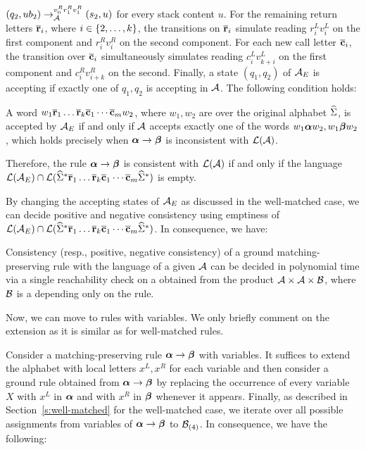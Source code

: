 $(q_2,u b_2) \rightarrow_{\mathcal{A}}^{v_0^R r_1^R v_1^R} (s_2, u)$ for every stack content $u$. 
For the remaining return letters $\overline{\mathbf{r}}_i$, where $i \in \{2, \ldots,k\}$,
the transitions on $\overline{\mathbf{r}}_i$ simulate reading  $r_i^L v_i^L$  on the first component and $r_i^R v_i^R$ on the second component.
For each new call letter $\overline{\mathbf{c}}_i$, the transition over $\overline{\mathbf{c}}_i$ simultaneously  simulates reading $c_i^L v_{k+i}^L$ on the first component and $c_i^R v_{i+k}^R$ on the second.
Finally, a state $(q_1, q_2)$ of $\mathcal{A}_E$ is accepting if exactly one of $q_1, q_2$ is accepting in $\mathcal{A}$. The following condition holds:
\begin{claim}
A  word  $w_1 \overline{\mathbf{r}}_1 \ldots \overline{\mathbf{r}}_k \overline{\mathbf{c}}_1 \cdots \overline{\mathbf{c}}_m w_2$, where $w_1, w_2$ are over the original alphabet $\widehat{\Sigma}$, is accepted by $\mathcal{A}_E$  
if and only if $\mathcal{A}$ accepts exactly one of the words $w_1 \boldsymbol{\alpha} w_2, w_1 \boldsymbol{\beta} w_2$, which holds precisely when $\boldsymbol{\alpha} \to \boldsymbol{\beta}$ is inconsistent with $\mathcal{L}(\mathcal{A})$.
\end{claim}
Therefore, the rule $\boldsymbol{\alpha} \to \boldsymbol{\beta}$ is consistent with $\mathcal{L}(\mathcal{A})$ if and only if
the language $\mathcal{L}(\mathcal{A}_E) \cap \mathcal{L}(\widehat{\Sigma}^* \overline{\mathbf{r}}_1 \ldots \overline{\mathbf{r}}_k \overline{\mathbf{c}}_1 \cdots \overline{\mathbf{c}}_m \widehat{\Sigma}^*)$ is empty.

By changing the accepting states of $\mathcal{A}_E$ as discussed in the well-matched case, we can decide positive and negative consistency 
using emptiness of $\mathcal{L}(\mathcal{A}_E) \cap \mathcal{L}(\widehat{\Sigma}^* \overline{\mathbf{r}}_1 \ldots \overline{\mathbf{r}}_k \overline{\mathbf{c}}_1 \cdots \overline{\mathbf{c}}_m \widehat{\Sigma}^*)$.
In consequence, we have:

\begin{proposition}
Consistency (resp.,  positive, negative consistency) of a ground matching-preserving rule with the language of a given \DVPA $\mathcal{A}$ can be decided in polynomial time via a single reachability check on a \DVPA obtained from the product $\mathcal{A} \times \mathcal{A} \times \mathcal{B}$, where $\mathcal{B}$ is a \DFA depending only on the rule.
\end{proposition}

Now, we can move to rules with variables. We only briefly comment on the extension as it is similar as for well-matched rules.

Consider a matching-preserving rule $\boldsymbol{\alpha} \to \boldsymbol{\beta}$ with variables.
It suffices to extend the alphabet with local letters $x^L, x^R$ for each variable and then consider a ground rule
obtained from  $\boldsymbol{\alpha} \to \boldsymbol{\beta}$ by replacing the occurrence of every variable $X$ with $x^L$ in $\boldsymbol{\alpha}$ and with $x^R$ in $\boldsymbol{\beta}$ whenever it appears.
Finally, as described in Section~\ref{s:well-matched} for the well-matched case, we iterate over all possible assignments from variables of $\boldsymbol{\alpha} \to \boldsymbol{\beta}$ to $\mathcal{B}_{(4)}$. 
In consequence, we have the following:

